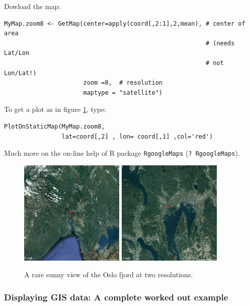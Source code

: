 \documentclass{article}
\begin{document}
 
\medskip
Dowload the map:

\begin{verbatim}
MyMap.zoom8 <- GetMap(center=apply(coord[,2:1],2,mean), # center of area 
                                                        # (needs Lat/Lon 
                                                        # not Lon/Lat!)
                      zoom =8,  # resolution
                      maptype = "satellite")
\end{verbatim}


\medskip
To get a plot as in figure \ref{fig:Oslo_fjord}, type:

\begin{verbatim}
PlotOnStaticMap(MyMap.zoom8,
                lat=coord[,2] , lon= coord[,1] ,col='red')
\end{verbatim}


\medskip
Much more on the on-line help of R package {\tt RgoogleMaps} ({\tt ? RgoogleMaps}).

\begin{figure}[h]
\hspace{2cm}\includegraphics[width=5cm]{../inst/images/MyMap_zoom7.jpeg} \hspace{1cm}\includegraphics[width=5cm]{../inst/images/MyMap_zoom10.jpeg}
\caption{A rare sunny view of the Oslo fjord at two resolutions.}\label{fig:Oslo_fjord}
\end{figure}


\subsubsection[Displaying GIS data]{Displaying GIS data: A complete worked out example }\label{sec:AH}
\end{document}
